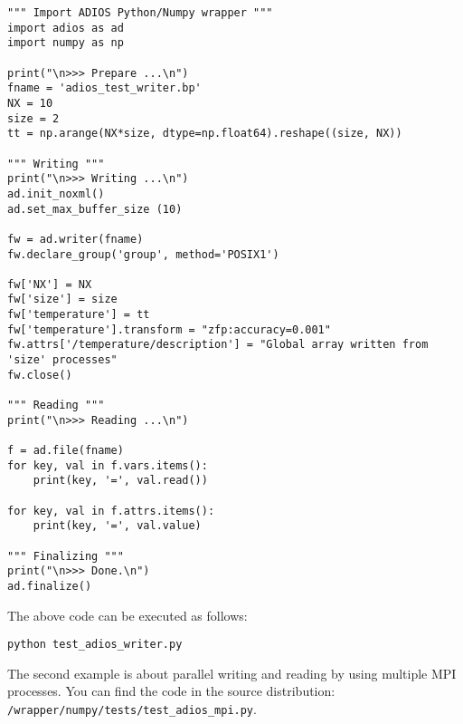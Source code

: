 \begin{lstlisting}[language=ADIOS-python,caption={A Python/Numpy example for writing/reading ADIOS BP file},label={},]
""" Import ADIOS Python/Numpy wrapper """
import adios as ad
import numpy as np

print("\n>>> Prepare ...\n")
fname = 'adios_test_writer.bp'
NX = 10
size = 2
tt = np.arange(NX*size, dtype=np.float64).reshape((size, NX))

""" Writing """
print("\n>>> Writing ...\n")
ad.init_noxml()
ad.set_max_buffer_size (10)

fw = ad.writer(fname)
fw.declare_group('group', method='POSIX1')

fw['NX'] = NX
fw['size'] = size
fw['temperature'] = tt
fw['temperature'].transform = "zfp:accuracy=0.001"
fw.attrs['/temperature/description'] = "Global array written from 'size' processes"
fw.close()

""" Reading """
print("\n>>> Reading ...\n")

f = ad.file(fname)
for key, val in f.vars.items():
    print(key, '=', val.read())

for key, val in f.attrs.items():
    print(key, '=', val.value)

""" Finalizing """
print("\n>>> Done.\n")
ad.finalize()
\end{lstlisting}

The above code can be executed as follows:
\begin{lstlisting}
python test_adios_writer.py
\end{lstlisting}

The second example is about parallel writing and reading by using multiple MPI processes. You can find the code in the source distribution: \verb+/wrapper/numpy/tests/test_adios_mpi.py+.


